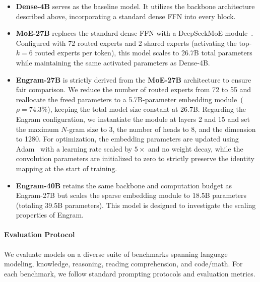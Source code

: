 \begin{itemize}
    \item \textbf{Dense-4B} serves as the baseline model. It utilizes the backbone architecture described above, incorporating a standard dense FFN into every block.

    \item \textbf{MoE-27B} replaces the standard dense FFN with a DeepSeekMoE module~\citep{dai2024deepseekmoe}. Configured with 72 routed experts and 2 shared experts (activating the top-$k=6$ routed experts per token), this model scales to 26.7B total parameters while maintaining the same activated parameters as Dense-4B.

    \item \textbf{Engram-27B} is strictly derived from the \textbf{MoE-27B} architecture to ensure fair comparison. We reduce the number of routed experts from 72 to 55 and reallocate the freed parameters to a 5.7B-parameter embedding module~($\rho=74.3\%$), keeping the total model size constant at 26.7B. Regarding the Engram configuration, we instantiate the module at layers 2 and 15 and set the maximum $N$-gram size to 3, the number of heads to 8, and the dimension to 1280. For optimization, the embedding parameters are updated using Adam~\citep{kingma2014adam} with a learning rate scaled by $5\times$ and no weight decay, while the convolution parameters are initialized to zero to strictly preserve the identity mapping at the start of training.

    \item \textbf{Engram-40B} retains the same backbone and computation budget as Engram-27B but scales the sparse embedding module to 18.5B parameters (totaling 39.5B parameters). This model is designed to investigate the scaling properties of Engram.
\end{itemize}

\paragraph{Evaluation Protocol}
We evaluate models on a diverse suite of benchmarks spanning language modeling, knowledge, reasoning, reading comprehension, and code/math.
For each benchmark, we follow standard prompting protocols and evaluation metrics.

